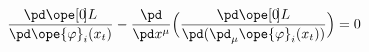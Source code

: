 \begin{equation}	\label{12.70}
\frac{\pd\ope[0\mspace{-3mu}]{L}}{\pd \ope{\varphi}_i(x_t)}
-
\frac{\pd}{\pd x^\mu}\Bigl(
	\frac{\pd\ope[0\mspace{-3mu}]{L}}{\pd(\pd_\mu\ope{\varphi}_i(x_t) )}
	 \Bigr)
 = 0
	\end{equation}

